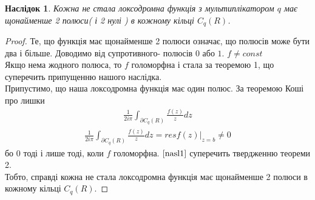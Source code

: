 \documentclass[12pt,a4paper]{article}
\begin{document}
\newtheorem{nasl}{Наслідок}
\begin{nasl}
 Кожна не стала локсодромна функція з мультиплікатором $q$ має щонайменше 2 полюси( і 2 нулі ) в кожному кільці $C_{q}(R)$.
\end{nasl}
\begin{proof}
Те, що функція має щонайменше 2 полюси означає, що полюсів може бути два і більше. Доводимо від супротивного- полюсів $0$ або $1$. $ f \neq const $\\
Якщо нема жодного полюса, то $f$ голоморфна і стала за теоремою 1, що суперечить припущенню нашого наслідка. \\
Припустимо, що наша локсодромна функція має один полюс. За теоремою Коші про лишки
\[\begin{array}{l}
\frac{1}{2i\pi}\int_{\partial C_{q}(R)}^{ } \frac{f(z)}{z}dz 
\end{array}\]
\begin{equation}\label{nasl1}
\begin{array}{l}
\frac{1}{2i\pi}\int_{\partial C_{q}(R)}^{ } \frac{f(z)}{z}dz= resf(z)\vert_{z=b} \neq 0 
\end{array} 
\end{equation}
бо $0$ тоді і лише тоді, коли $f$ голоморфна.
$\eqref {nasl1} $ суперечить твердженню теореми 2. \\
Тобто, справді кожна не стала локсодромна функція має щонайменше 2 полюси в кожному кільці $C_{q}(R)$.
\end{proof}
\[\begin{array}{l}
\end{array} \]
\end{document}
